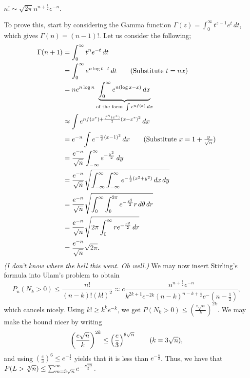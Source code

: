 \newpage
\begin{simplethm}
    $n! \sim \sqrt{2 \pi} n^{n + \frac{1}{2}} e^{-n}$.
\end{simplethm}
\noindent To prove this, start by considering the Gamma function $\Gamma(z) = \int_0^\infty t^{z-1}e^t \, dt$, which gives $\Gamma(n) = (n-1)!$. Let us consider the following;
\begin{align*}
    \Gamma(n + 1) &= \int_0^\infty t^n e^{-t} \, dt \\
    &= \int_0^\infty e^{n \log t - t} \, dt \tag{Substitute $t = nx$} \\
    &= n e^{n \log n} \underbrace{\int_0^\infty e^{n(\log x - x)} \, dx}_{\text{of the form } \int e^{n f(x)} \, dx} \\
    &\approx \int e^{n f(x^\ast) + \frac{f''(x^\ast)}{2} (x - x^\ast)^2} \, dx \\
    &= e^{-n} \int e^{-\frac{n}{2} (x-1)^2} \, dx \tag{Substitute $x = 1 + \frac{y}{\sqrt{n}}$} \\
    &= \frac{e^{-n}}{\sqrt{n}} \int_{-\infty}^\infty e^{-\frac{y^2}{2}} \, dy \\
    &= \frac{e^{-n}}{\sqrt{n}} \sqrt{\int_{-\infty}^\infty \int_{-\infty}^\infty e^{-\frac{1}{2}(x^2 + y^2)} \, dx \, dy} \\
    &= \frac{e^{-n}}{\sqrt{n}} \sqrt{\int_0^\infty \int_0^{2\pi} e^{-\frac{r^2}{2}} r \, d\theta \, dr } \\
    &= \frac{e^{-n}}{\sqrt{n}} \sqrt{2\pi \int_0^\infty re^{-\frac{r^2}{2}} \, dr} \\
    &= \frac{e^{-n}}{\sqrt{n}} \sqrt{2\pi}.
\end{align*}
\textit{(I don't know where the hell this went. Oh well.)}
\medskip\newline
\noindent We may now insert Stirling's formula into Ulam's problem to obtain
\[ P_n(N_k > 0) \leq \frac{n!}{(n-k)!(k!)^2} \approx c \frac{n^{n + \frac{1}{2}} e^{-n}}{k^{2k+1} e^{-2k} (n-k)^{n-k+\frac{1}{2}} e^-(n-\frac{1}{2})}, \]
which cancels nicely. Using $k! \geq k^k e^{-k}$, we get $P(N_k > 0) \leq (\frac{e\sqrt{n}}{k})^{2k}$. We may make the bound nicer by writing
\[ \left(\frac{e \sqrt{n}}{k}\right)^{2k} \leq \left(\frac{e}{3}\right)^{6\sqrt{n}} \tag{$k = 3\sqrt{n}$}, \]
and using $(\frac{e}{3})^6 \leq e^{-\frac{1}{2}}$ yields that it is less than $e^{-\frac{n}{2}}$. Thus, we have that $P(L > \sqrt[3]{n}) \leq \sum_{m=3\sqrt{n}}^\infty e^{-\frac{\sqrt{m}}{2}}$.

